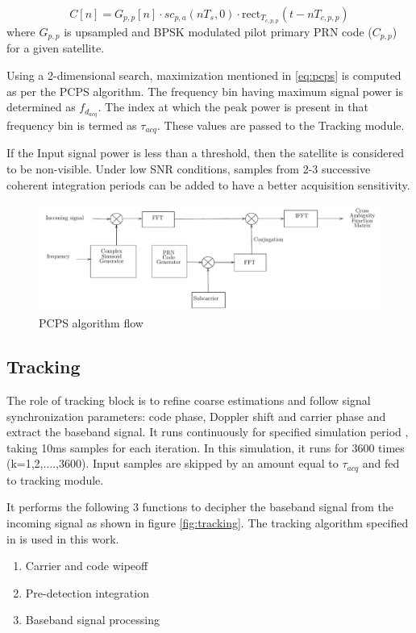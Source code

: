 \documentclass[conference]{IEEEtran}
\begin{document}
\begin{equation}
 C[n] = G_{p,p}[n] \cdot sc_{p,a}(nT_s, 0) \cdot \text{rect}_{T_{c,p,p}} \left( t - nT_{c,p,p}\right)
 \label{eq:pcps3}
\end{equation}
\noindent where $G_{p,p}$ is upsampled and BPSK modulated pilot primary PRN code ($C_{p,p}$) for a given satellite.

Using a 2-dimensional search, maximization mentioned in \ref{eq:pcps} is computed as per the PCPS algorithm.
The frequency bin having maximum signal power is determined as $f_{d_{acq}}$. The index at which the peak power 
is present in that frequency bin is termed as $\tau_{acq}$. These values are passed to the Tracking module. 

If the Input signal power is less than a threshold, then the satellite is 
considered to be non-visible. Under low SNR conditions, samples from 2-3 successive coherent 
integration periods can be added to have a better acquisition sensitivity.

\begin{normalsize}
\begin{figure}[ht]
	\centering
	\includegraphics[width=1\columnwidth]{figs/pcps}
	\centering
	\caption{PCPS algorithm flow}
	\label{fig:pcps_flow}
\end{figure}
\end{normalsize}

\subsection{Tracking}
The role of tracking block \cite{b5} is to refine coarse estimations and follow signal synchronization parameters: code phase, Doppler shift 
and carrier phase and extract the baseband signal. It runs continuously for specified simulation period , taking 10ms samples for each iteration. 
In this simulation, it runs for 3600 times (k=1,2,....,3600). Input samples are skipped by an amount equal to $\tau_{acq}$ and fed to tracking module.

It performs the following 3 functions to decipher 
the baseband signal from the incoming signal as shown in figure \ref{fig:tracking}. The tracking algorithm 
specified in \cite{b1} is used in this work.
\begin{enumerate}
	\item Carrier and code wipeoff 
	\item Pre-detection integration
	\item Baseband signal processing
\end{enumerate}
\end{document}
